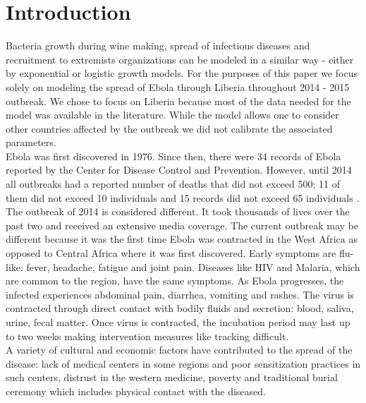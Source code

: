 \documentclass[10pt]{article}
\begin{document}
\section{Introduction}
Bacteria growth during wine making, spread of infectious diseases and recruitment to extremists organizations can be modeled in a similar way - either by exponential or logistic growth models. For the purposes of this paper we focus solely on modeling the spread of Ebola through Liberia throughout 2014 - 2015 outbreak. We chose to focus on Liberia because most of the data needed for the model was available in the literature. While the model allows one to consider other countries affected by the outbreak we did not calibrate the associated parameters. \\
%
%
%
Ebola was first discovered in 1976. Since then, there were 34 records of Ebola reported by the Center for Disease Control and Prevention. However, until 2014 all outbreaks had a reported number of deaths that did not exceed 500; 11 of them did not exceed 10 individuals and 15 records did not exceed 65 individuals \cite{CDCOutbreaks}.  The outbreak of 2014 is considered different. It took thousands of lives over the past two and received an extensive media coverage.
%
%
%
The current outbreak may be different because it was the first time Ebola was contracted in the West Africa as opposed to Central Africa where it was first discovered. Early symptoms are flu-like: fever, headache, fatigue and joint pain. Diseases like HIV and Malaria, which are common to the region, have the same symptoms. As Ebola progresses, the infected experiences abdominal pain, diarrhea, vomiting and rashes. The virus is contracted through direct contact with bodily fluids and secretion: blood, saliva, urine, fecal matter. Once virus is contracted, the incubation period may last up to two weeks making intervention measures like tracking difficult. 
%
%
%
\\A variety of cultural and economic factors have contributed to the spread of the disease: lack of medical centers in some regions and poor sensitization practices in such centers, distrust in the western medicine, poverty and traditional burial ceremony which includes physical contact with the diseased. \\
%
%
%
\end{document}
